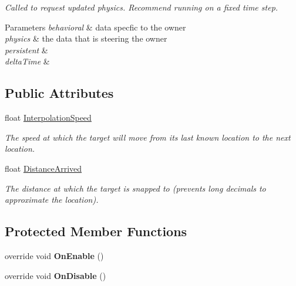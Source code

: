 \begin{DoxyCompactItemize}
\begin{DoxyCompactList}\small\item\em Called to request updated physics. Recommend running on a fixed time step. 


\begin{DoxyParams}{Parameters}
{\em behavioral} & data specfic to the owner\\
\hline
{\em physics} & the data that is steering the owner\\
\hline
{\em persistent} & \\
\hline
{\em delta\-Time} & \\
\hline
\end{DoxyParams}
 \end{DoxyCompactList}\end{DoxyCompactItemize}
\subsection*{Public Attributes}
\begin{DoxyCompactItemize}
\item 
float \hyperlink{class_skyrates_1_1_a_i_1_1_decorator_1_1_smooth_target_a4d83be120553c3b0d42b6cf78d28386d}{Interpolation\-Speed}
\begin{DoxyCompactList}\small\item\em The speed at which the target will move from its last known location to the next location. \end{DoxyCompactList}\item 
float \hyperlink{class_skyrates_1_1_a_i_1_1_decorator_1_1_smooth_target_a48d78b71d13d4bdbb8ed967d30e26242}{Distance\-Arrived}
\begin{DoxyCompactList}\small\item\em The distance at which the target is snapped to (prevents long decimals to approximate the location). \end{DoxyCompactList}\end{DoxyCompactItemize}
\subsection*{Protected Member Functions}
\begin{DoxyCompactItemize}
\item 
\hypertarget{class_skyrates_1_1_a_i_1_1_decorator_1_1_smooth_target_adc10e090c813636e9c0c169333424e4d}{override void {\bfseries On\-Enable} ()}\label{class_skyrates_1_1_a_i_1_1_decorator_1_1_smooth_target_adc10e090c813636e9c0c169333424e4d}

\item 
\hypertarget{class_skyrates_1_1_a_i_1_1_decorator_1_1_smooth_target_a48e2ee1629c8c6dba0c8e56739f624d6}{override void {\bfseries On\-Disable} ()}\label{class_skyrates_1_1_a_i_1_1_decorator_1_1_smooth_target_a48e2ee1629c8c6dba0c8e56739f624d6}

\end{DoxyCompactItemize}


